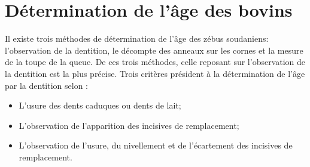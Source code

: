 \chapter{Détermination de l'âge des bovins} \label{annex:age-guide}

\renewcommand{\thefigure}{C.\arabic{figure}}
\setcounter{figure}{0}
\renewcommand{\thetable}{C.\Roman{table}}
\setcounter{table}{0}


Il existe trois méthodes de détermination de l'âge des zébus soudaniens: l'observation de la dentition, le décompte des anneaux sur les cornes et la mesure de la toupe de la queue. De ces trois méthodes, celle reposant sur l'observation de la dentition est la plus précise. Trois critères président à la détermination de l'âge par la dentition selon :
\begin{itemize}
	\item L'usure des dents caduques ou dents de lait;
	\item L'observation de l'apparition des incisives de remplacement;
	\item L'observation de l'usure, du nivellement et de l'écartement des incisives de remplacement.
\end{itemize} 

